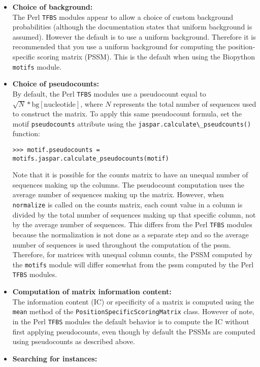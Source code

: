 \begin{itemize}
\item\textbf{Choice of background:} \\
The Perl \verb+TFBS+ modules appear to allow a choice of custom background probabilities (although the documentation states that uniform background is assumed). However the default is to use a uniform background. Therefore it is recommended that you use a uniform background for computing the position-specific scoring matrix (PSSM). This is the default when using the Biopython \verb+motifs+ module.
\item\textbf{Choice of pseudocounts:} \\
By default, the Perl \verb+TFBS+ modules use a pseudocount equal to $\sqrt{N} * \textrm{bg}[\textrm{nucleotide}]$, where $N$ represents the total number of sequences used to construct the matrix. To apply this same pseudocount formula, set the motif \verb+pseudocounts+ attribute using the \verb+jaspar.calculate\_pseudcounts()+ function:
\begin{verbatim}
>>> motif.pseudocounts = motifs.jaspar.calculate_pseudocounts(motif)
\end{verbatim}
Note that it is possible for the counts matrix to have an unequal number of sequences making up the columns. The pseudocount computation uses the average number of sequences making up the matrix. However, when \verb+normalize+ is called on the counts matrix, each count value in a column is divided by the total number of sequences making up that specific column, not by the average number of sequences. This differs from the Perl \verb+TFBS+ modules because the normalization is not done as a separate step and so the average number of sequences is used throughout the computation of the pssm. Therefore, for matrices with unequal column counts, the PSSM computed by the \verb+motifs+ module will differ somewhat from the pssm computed by the Perl \verb+TFBS+ modules.
\item\textbf{Computation of matrix information content:} \\
The information content (IC) or specificity of a matrix is computed using the \verb+mean+ method of the \verb+PositionSpecificScoringMatrix+ class. However of note, in the Perl \verb+TFBS+ modules the default behavior is to compute the IC without first applying pseudocounts, even though by default the PSSMs are computed using pseudocounts as described above.
\item\textbf{Searching for instances:} \\

\end{itemize}

